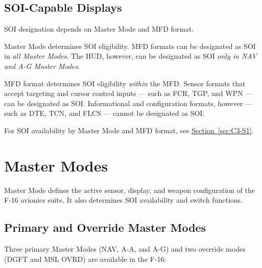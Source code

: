 \documentclass[11pt, a4paper, twoside]{report}
\newcommand{\secref}[1]{\hyperref[#1]{Section~\ref*{#1}}}
\begin{document}
\subsection{SOI-Capable Displays}
\label{sec:C2-S1-S3}

SOI designation depends on Master Mode and MFD format.

Master Mode determines SOI eligibility. MFD formats can be designated as SOI in \textit{all Master Modes}. The HUD, however, can be designated as SOI \textit{only in NAV and A-G Master Modes}.

MFD format determines SOI eligibility \textit{within} the MFD. Sensor formats that accept targeting and cursor control inputs --- such as FCR, TGP, and WPN --- can be designated as SOI. Informational and configuration formats, however --- such as DTE, TCN, and FLCS --- cannot be designated as SOI.

For SOI availability by Master Mode and MFD format, see \secref{sec:C3-S1}.

\section{Master Modes}
\label{sec:C2-S2}

Master Mode defines the active sensor, display, and weapon configuration of the F-16 avionics suite. It also determines SOI availability and switch functions.

\subsection{Primary and Override Master Modes}
\label{sec:C2-S2-S1}

Three primary Master Modes (NAV, A-A, and A-G) and two override modes (DGFT and MSL OVRD) are available in the F-16:
\end{document}

